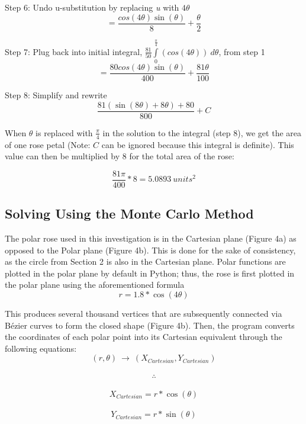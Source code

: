 \documentclass[11pt]{article}
\begin{document}
Step 6: Undo u-substitution by replacing \emph{u} with $4\theta$
\[=\frac{cos(4\theta)\sin(\theta)}{8} + \frac{\theta}{2}\]

Step 7: Plug back into initial integral, $\frac{81}{50}\int\limits_{0}^{\frac{\pi}{4}} (cos(4\theta)) \ d\theta $, from step 1
\[=\frac{80cos(4\theta)\sin(\theta)}{400} + \frac{81\theta}{100}\]

Step 8: Simplify and rewrite
\[\frac{81(\sin(8\theta)+8 \theta) + 80}{800} + C\]


When $\theta$ is replaced with $\frac{\pi}{4}$ in the solution to the integral (step 8), we get the area of one rose petal (Note: $C$ can be ignored because this integral is definite). This value can then be multiplied by 8 for the total area of the rose:

\[\frac{81 \pi}{400} * 8 = \boxed{5.0893 \ units^2}\]

\subsection{Solving Using the Monte Carlo Method}

The polar rose used in this investigation is in the Cartesian plane (Figure 4a) as opposed to the Polar plane (Figure 4b). This is done for the sake of consistency, as the circle from Section 2 is also in the Cartesian plane. Polar functions are plotted in the polar plane by default in Python; thus, the rose is first plotted in the polar plane using the aforementioned formula\\[-3ex]

\[r=1.8*\cos(4\theta)\]

This produces several thousand vertices that are subsequently connected via Bézier curves to form the closed shape (Figure 4b). Then, the program converts the coordinates of each polar point into its Cartesian equivalent through the following equations: \\[-3ex]

\[(r,\theta) \ \rightarrow \ (X_{Cartesian}, Y_{Cartesian})\]\\[-7ex]
\[\therefore\]\\[-7ex]

\[X_{Cartesian}=r*\cos(\theta)\]\\[-7ex]
\[Y_{Cartesian}=r*\sin(\theta)\]
\end{document}
